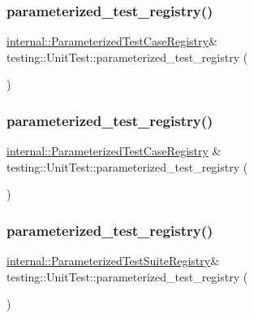 \subsubsection{\texorpdfstring{parameterized\_test\_registry()}{parameterized\_test\_registry()}\hspace{0.1cm}{\footnotesize\ttfamily [1/3]}}
{\footnotesize\ttfamily \mbox{\hyperlink{classtesting_1_1internal_1_1_parameterized_test_case_registry}{internal\+::\+Parameterized\+Test\+Case\+Registry}}\& testing\+::\+Unit\+Test\+::parameterized\+\_\+test\+\_\+registry (\begin{DoxyParamCaption}{ }\end{DoxyParamCaption})}

\mbox{\label{classtesting_1_1_unit_test_a8f9c5d0d9f1b6d23c94070944a43c550}} 
\subsubsection{\texorpdfstring{parameterized\_test\_registry()}{parameterized\_test\_registry()}\hspace{0.1cm}{\footnotesize\ttfamily [2/3]}}
{\footnotesize\ttfamily \mbox{\hyperlink{classtesting_1_1internal_1_1_parameterized_test_case_registry}{internal\+::\+Parameterized\+Test\+Case\+Registry}} \& testing\+::\+Unit\+Test\+::parameterized\+\_\+test\+\_\+registry (\begin{DoxyParamCaption}{ }\end{DoxyParamCaption})}

\mbox{\label{classtesting_1_1_unit_test_a3f72b753a9eda20bf7ab2aef0bdcc40f}} 
\subsubsection{\texorpdfstring{parameterized\_test\_registry()}{parameterized\_test\_registry()}\hspace{0.1cm}{\footnotesize\ttfamily [3/3]}}
{\footnotesize\ttfamily \mbox{\hyperlink{classtesting_1_1internal_1_1_parameterized_test_suite_registry}{internal\+::\+Parameterized\+Test\+Suite\+Registry}}\& testing\+::\+Unit\+Test\+::parameterized\+\_\+test\+\_\+registry (\begin{DoxyParamCaption}{ }\end{DoxyParamCaption})}

